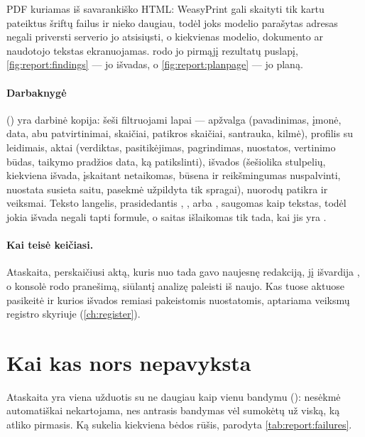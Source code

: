 PDF kuriamas iš savarankiško HTML: WeasyPrint gali skaityti tik kartu pateiktus šriftų failus ir
nieko daugiau, todėl joks modelio parašytas adresas negali priversti serverio jo atsisiųsti, o
kiekvienas modelio, dokumento ar naudotojo tekstas ekranuojamas.  rodo
jo pirmąjį rezultatų puslapį, \cref{fig:report:findings} --- jo išvadas, o
\cref{fig:report:planpage} --- jo planą.

\paragraph{Darbaknygė} () yra darbinė kopija: šeši filtruojami lapai ---
apžvalga (pavadinimas, įmonė, data, abu patvirtinimai, skaičiai, patikros skaičiai, santrauka,
kilmė), profilis su leidimais, aktai (verdiktas, pasitikėjimas, pagrindimas, nuostatos,
vertinimo būdas, taikymo pradžios data, ką patikslinti), išvados (šešiolika stulpelių, kiekviena
išvada, įskaitant netaikomas, būsena ir reikšmingumas nuspalvinti, nuostata susieta saitu,
pasekmė užpildyta tik spragai),
nuorodų patikra ir veiksmai. Teksto langelis, prasidedantis \code{=}, \code{+}, \code{-} arba
, saugomas kaip tekstas, todėl jokia išvada negali tapti formule, o saitas išlaikomas tik
tada, kai jis yra .

\paragraph{Kai teisė keičiasi.} Ataskaita, perskaičiusi aktą, kuris nuo tada gavo naujesnę
redakciją, jį išvardija , o konsolė rodo pranešimą, siūlantį analizę paleisti
iš naujo. Kas tuose aktuose pasikeitė ir kurios išvados remiasi pakeistomis nuostatomis,
aptariama veiksmų registro skyriuje (\cref{ch:register}).


\section{Kai kas nors nepavyksta}\label{sec:report:failures}

Ataskaita yra viena užduotis su ne daugiau kaip vienu bandymu (): nesėkmė
automatiškai nekartojama, nes antrasis bandymas vėl sumokėtų už viską, ką atliko pirmasis. Ką
sukelia kiekviena bėdos rūšis, parodyta \cref{tab:report:failures}.

